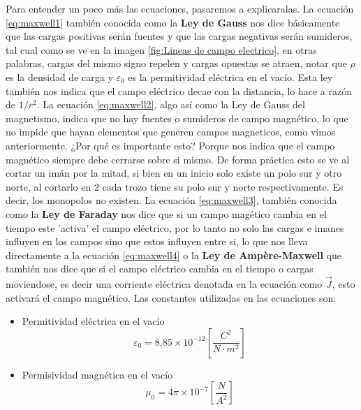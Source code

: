 Para entender un poco más las ecuaciones, pasaremos a explicaralas. La ecuación \eqref{eq:maxwell1} también conocida como la \textbf{Ley de Gauss} nos dice básicamente que las cargas positivas serán fuentes y que las cargas negativas serán sumideros, tal cual como se ve en la imagen \ref{fig:Lineas de campo electrico}, en otras palabras, cargas del mismo signo repelen y cargas opuestas se atraen, notar que $\rho$ es la densidad de carga y $\varepsilon_0$ es la permitividad eléctrica en el vacío. Esta ley también nos indica que el campo eléctrico decae con la distancia, lo hace a razón de $1/r^2$. La ecuación \eqref{eq:maxwell2}, algo así como la Ley de Gauss del magnetismo, indica que no hay fuentes o sumideros de campo magnético, lo que no impide que hayan elementos que generen campos magneticos, como vimos anteriormente. ¿Por qué es importante esto? Porque nos indica que el campo magnético siempre debe cerrarse sobre si mismo. De forma práctica esto se ve al cortar un imán por la mitad, si bien en un inicio solo existe un polo sur y otro norte, al cortarlo en 2 cada trozo tiene su polo sur y norte respectivamente. Es decir, los monopolos no existen. La ecuación \eqref{eq:maxwell3}, también conocida como la \textbf{Ley de Faraday}  nos dice que si un campo magético cambia en el tiempo este 'activa' el campo eléctrico, por lo tanto no solo las cargas e imanes influyen en los campos sino que estos influyen entre si, lo que nos lleva directamente a la ecuación \eqref{eq:maxwell4} o la \textbf{Ley de Ampère-Maxwell} que también nos dice que si el campo eléctrico cambia en el tiempo o cargas moviendose, es decir una corriente eléctrica denotada en la ecuación como $\vec{J}$, esto activará el campo magnético. Las constantes utilizadas en las ecuaciones son:
\begin{itemize}
\item Permitividad eléctrica en el vacío
$$\varepsilon_0=8.85\times 10^{-12} \left[\frac{C^2}{N\cdot m^2}\right]$$
\item Permisividad magnética en el vacío
$$\mu_0=4 \pi \times 10^{-7}\left[\frac{N}{A^2}\right]$$
\end{itemize}

